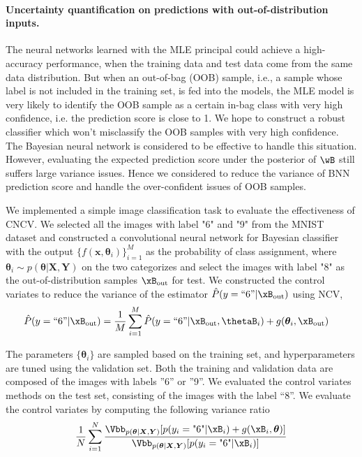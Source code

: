 \documentclass[runningheads]{llncs}
\begin{document}
\paragraph{Uncertainty quantification on predictions with out-of-distribution inputs.} The neural networks learned with the MLE principal could achieve a high-accuracy performance, when the training data and test data come from the same data distribution. But when an out-of-bag (OOB) sample, i.e., a sample whose label is not included in the training set, is fed into the models, the MLE model is very likely to identify the OOB sample as a certain in-bag class with very high confidence, i.e. the prediction score is close to 1. We hope to construct a robust classifier which won't misclassify the OOB samples with very high confidence. The Bayesian neural network is considered to be effective to handle this situation. However, evaluating the expected prediction score under the posterior of $\wB$ still suffers large variance issues. Hence we considered to reduce the variance of BNN prediction score and handle the over-confident issues of OOB samples.

We implemented a simple image classification task to evaluate the effectiveness of CNCV. We selected all the images with label "6" and "9" from the MNIST dataset and constructed a convolutional neural network for Bayesian classifier with the output $\{f(\bm{x}, \bm{\theta}_i)\}_{i=1}^M$ as the probability of class assignment, where $\bm{\theta}_i \sim p(\bm{\theta} | \bm{X}, \bm{Y})$ on the two categorizes and select the images with label "8" as the out-of-distribution samples $\xB_{\text{out}}$ for test.  %
We constructed the control variates to reduce the variance of the estimator $\hat{P}(y = \text{``6''} |\xB_{\text{out}} )$ using NCV,
\begin{align}\label{BNNest: oob}
\hat{P}(y = \text{``6''}|\xB_{\text{out}}) &= \frac{1}{M}\sum_{i=1}^M \hat{P}(y = \text{``6''}|\xB_{\text{out}}, \thetaB_i) + g(\bm{\theta}_i, \xB_{\text{out}})
\end{align}

The  parameters $\{ \bm{\theta}_i \}$  are sampled based on the training set, and hyperparameters are tuned using the validation set. Both the training and validation data are composed of the images with labels ''6'' or ''9''. We evaluated the control variates methods on the test set, consisting of the images with the label ``8''. We evaluate the control variates by computing the following variance ratio
\begin{equation}
\frac{1}{N}\sum_{i=1}^N \frac{\Vbb_{p(\bm{\theta}|\bm{X}, \bm{Y})}[p(y_i = \text{"6"}| \xB_i) + g(\xB_i, \bm{\theta})]}{\Vbb_{p(\bm{\theta}| \bm{X}, \bm{Y})}[p(y_i = \text{"6"}| \xB_i)]}
\end{equation}
\end{document}

